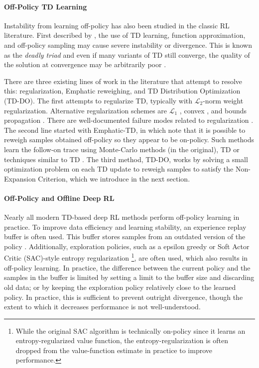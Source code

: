 \paragraph{Off-Policy TD Learning} Instability from learning off-policy has also been studied in the classic RL literature.
First described by \citet{tsitsiklis1996analysis}, the use of TD learning, function approximation, and off-policy sampling may cause severe instability or divergence. This is known as the \emph{deadly triad} \citep[p.~264]{sutton2020reinforcement} and even if many variants of TD still converge, the quality of the solution at convergence may be arbitrarily poor \citep{kolter2011fixed}.


There are three existing lines of work in the literature that attempt to resolve this: regularization, Emphatic reweighing, and TD Distribution Optimization (TD-DO).
The first attempts to regularize TD, typically with $\mathcal L_2$-norm weight regularization. Alternative regularization schemes are $\mathcal L_1$ \citep{mahadevan2014proximal}, convex \citep{yu2017convergence}, and bounds propagation \citep{kumar2020discor}. There are well-documented failure modes related to regularization \cite{manek2022pitfalls}.
The second line started with Emphatic-TD, in which \citet{sutton2016emphatic} note that it is possible to reweigh samples obtained off-policy so they appear to be on-policy. Such methods learn the follow-on trace using Monte-Carlo methods (in the original), TD \citep{jiang2021learning,zhang2020provably} or techniques similar to TD \citep{hasselt2021expected}. The third method, TD-DO, works by solving a small optimization problem on each TD update to reweigh samples to satisfy the Non-Expansion Criterion, which we introduce in the next section.

\paragraph{Off-Policy and Offline Deep RL}

Nearly all modern TD-based deep RL methods perform off-policy learning in practice.
To improve data efficiency and learning stability, an experience replay buffer is often used. This buffer stores samples from an outdated version of the policy \citep{mnih2015humanlevel}.
Additionally, exploration policies, such as a epsilon greedy \citep[p.~100]{sutton2020reinforcement} or Soft Actor Critic (SAC)-style entropy regularization \citep{haarnoja2018soft} \footnote{While the original SAC algorithm is technically on-policy since it learns an entropy-regularized value function, the entropy-regularization is often dropped from the value-function estimate in practice to improve performance.}, are often used, which also results in off-policy learning.
In practice, the difference between the current policy and the samples in the buffer is limited by setting a limit to the buffer size and discarding old data; or by keeping the exploration policy relatively close to the learned policy. In practice, this is sufficient to prevent outright divergence, though the extent to which it decreases performance is not well-understood.


